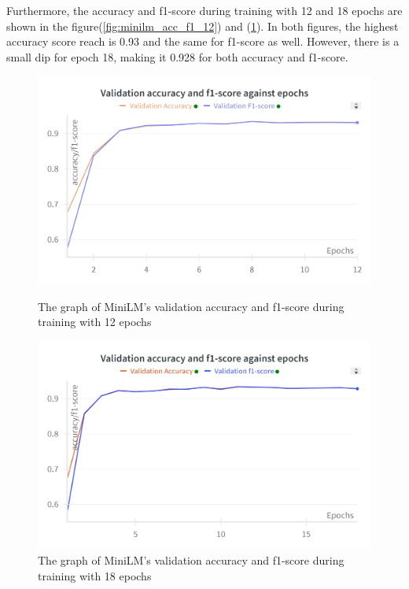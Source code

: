 Furthermore, the accuracy and f1-score during training with 12 and 18 epochs are shown in the figure(\ref{fig:minilm_acc_f1_12}) and (\ref{fig:minilm_acc_f1_18}). In both figures, the highest accuracy score reach is 0.93 and the same for f1-score as well. However, there is a small dip for epoch 18, making it 0.928 for both accuracy and f1-score. 

\begin{figure}[h!]
    \centering
    \begin{minipage}{.5\textwidth}
        \centering
        \includegraphics[width=1\linewidth]{Figures/valid_acc_f1_12_epochs_minilm.png}
        \caption{The graph of MiniLM's validation accuracy and f1-score during training with 12 epochs}
        \label{fig:minilm_acc_f1_12}
    \end{minipage}%
    \begin{minipage}{.5\textwidth}
        \centering
        \includegraphics[width=1\linewidth]{Figures/val_acc_f1_18_epochs_minilm.png}
        \caption{The graph of MiniLM's validation accuracy and f1-score during training with 18 epochs}
        \label{fig:minilm_acc_f1_18}
    \end{minipage}
\end{figure}

